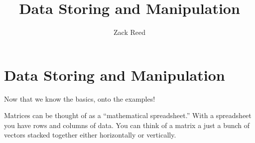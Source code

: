 \documentclass{ximera}
\author{Zack Reed} %
\title{Data Storing and Manipulation}
\begin{document}
\begin{abstract}

\end{abstract}
\maketitle

\section*{Data Storing and Manipulation}

Now that we know the basics, onto the examples!

Matrices can be thought of as a ``mathematical spreadsheet.'' With a
spreadsheet you have rows and columns of data.  You can think of a
matrix a just a bunch of vectors stacked together either horizontally
or vertically.
\end{document}
